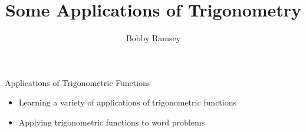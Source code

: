 \documentclass{ximera}
\author{Bobby Ramsey}
\title{Some Applications of Trigonometry}
\begin{document}
\begin{abstract}
\end{abstract}
\maketitle


\begin{objectives}
	
	\item Applications of Trigonometric Functions
		\begin{itemize}
			\item Learning a variety of applications of trigonometric functions
			\item Applying trigonometric functions to word problems
		\end{itemize}
\end{objectives}
\end{document}
